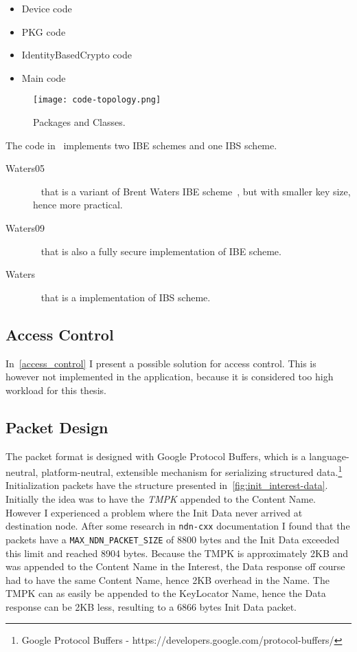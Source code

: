 \begin{itemize}
  \item Device code~\cite[device.py]{garseg15}
  \item \gls{PKG} code~\cite[publicKeyGenerator.py]{garseg15}
  \item IdentityBasedCrypto code~\cite[identityBasedCrypto.py]{garseg15}
  \item Main code~\cite[application.py]{garseg15}
\end{itemize}

\begin{figure}[ht]
  \centering
  \texttt{[image: code-topology.png]}
  \caption{Packages and Classes.}
  \label{fig:code-topology}
\end{figure}

The code in~\cite[identityBasedCrypto.py]{garseg15} implements two \gls{IBE} schemes and one \gls{IBS} scheme. 
\begin{description}
  \item[Waters05]~\cite{DBLP:journals/iacr/Naccache05} that is a variant of Brent Waters \gls{IBE} scheme~\cite{DBLP:journals/iacr/Waters04}, but with smaller key size, hence more practical.
  \item[Waters09]~\cite{DBLP:conf/crypto/Waters09} that is also a fully secure implementation of \gls{IBE} scheme.
  \item[Waters]~\cite{DBLP:journals/iacr/Waters04} that is a implementation of \gls{IBS} scheme.
\end{description}

\subsection{Access Control}
In~\autoref{access_control} I present a possible solution for access control.
This is however not implemented in the application, because it is considered too high workload for this thesis.

\subsection{Packet Design}
The packet format is designed with Google Protocol Buffers, which is a language-neutral, platform-neutral, extensible mechanism for serializing structured data.\footnote{Google Protocol Buffers - https://developers.google.com/protocol-buffers/}
Initialization packets have the structure presented in~\autoref{fig:init_interest-data}.
Initially the idea was to have the \textit{\gls{TMPK}} appended to the Content Name. 
However I experienced a problem where the Init Data never arrived at destination node. 
After some research in \texttt{ndn-cxx} documentation I found that the packets have a \texttt{MAX\_NDN\_PACKET\_SIZE} of 8800 bytes and the Init Data exceeded this limit and reached 8904 bytes.
Because the \gls{TMPK} is approximately 2\gls{KB} and was appended to the Content Name in the Interest, the Data response off course had to have the same Content Name, hence 2\gls{KB} overhead in the Name. 
The \gls{TMPK} can as easily be appended to the KeyLocator Name, hence the Data response can be 2\gls{KB} less, resulting to a 6866 bytes Init Data packet.

